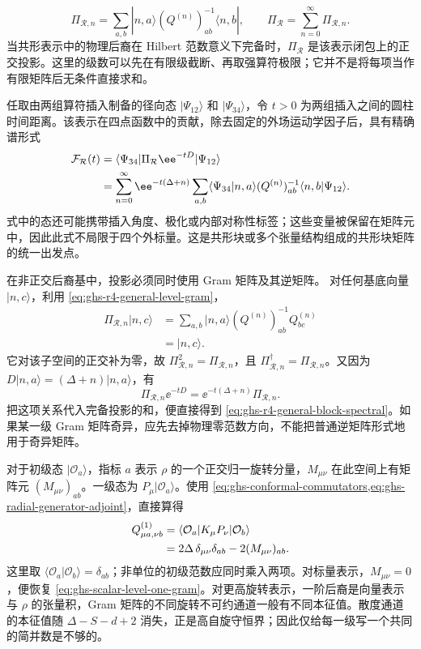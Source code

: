 \begin{equation}\label{eq:ghs-r4-general-projector}
 \Pi_{\mathcal R,n}=\sum_{a,b}|n,a\rangle
 (Q^{(n)})^{-1}_{ab}\langle n,b|,
 \qquad
 \Pi_{\mathcal R}=\sum_{n=0}^\infty\Pi_{\mathcal R,n}.
\end{equation}
当共形表示中的物理后裔在 Hilbert 范数意义下完备时，$\Pi_{\mathcal R}$ 是该表示闭包上的正交投影。这里的级数可以先在有限级截断、再取强算符极限；它并不是将每项当作有限矩阵后无条件直接求和。

任取由两组算符插入制备的径向态 $|\Psi_{12}\rangle$ 和 $|\Psi_{34}\rangle$，令 $t>0$ 为两组插入之间的圆柱时间距离。该表示在四点函数中的贡献，除去固定的外场运动学因子后，具有精确谱形式
\begin{align}\label{eq:ghs-r4-general-block-spectral}
 \mathcal F_{\mathcal R}(t)
 &=\langle\Psi_{34}|\Pi_{\mathcal R}\ee^{-tD}|\Psi_{12}\rangle\\
 &=\sum_{n=0}^\infty\ee^{-t(\Delta+n)}
 \sum_{a,b}\langle\Psi_{34}|n,a\rangle
 (Q^{(n)})^{-1}_{ab}\langle n,b|\Psi_{12}\rangle.
 \notag
\end{align}
式中的态还可能携带插入角度、极化或内部对称性标签；这些变量被保留在矩阵元中，因此此式不局限于四个外标量。这是共形块或多个张量结构组成的共形块矩阵的统一出发点。


在非正交后裔基中，投影必须同时使用 Gram 矩阵及其逆矩阵。
对任何基底向量 $|n,c\rangle$，利用 \cref{eq:ghs-r4-general-level-gram}，
\begin{align*}
 \Pi_{\mathcal R,n}|n,c\rangle
 &=\sum_{a,b}|n,a\rangle(Q^{(n)})^{-1}_{ab}Q^{(n)}_{bc}\\
 &=|n,c\rangle.
\end{align*}
它对该子空间的正交补为零，故 $\Pi_{\mathcal R,n}^2=\Pi_{\mathcal R,n}$，且 $\Pi_{\mathcal R,n}^\dagger=\Pi_{\mathcal R,n}$。又因为 $D|n,a\rangle=(\Delta+n)|n,a\rangle$，有
\begin{equation*}
 \Pi_{\mathcal R,n}\ee^{-tD}=\ee^{-t(\Delta+n)}\Pi_{\mathcal R,n}.
\end{equation*}
把这项关系代入完备投影的和，便直接得到 \cref{eq:ghs-r4-general-block-spectral}。如果某一级 Gram 矩阵奇异，应先去掉物理零范数方向，不能把普通逆矩阵形式地用于奇异矩阵。


对于初级态 $|\mathcal O_a\rangle$，指标 $a$ 表示 $\rho$ 的一个正交归一旋转分量，$M_{\mu\nu}$ 在此空间上有矩阵元 $(M_{\mu\nu})_{ab}$。一级态为 $P_\mu|\mathcal O_a\rangle$。使用 \cref{eq:ghs-conformal-commutators,eq:ghs-radial-generator-adjoint}，直接算得
\begin{align}\label{eq:ghs-r4-spinning-first-gram}
 Q^{(1)}_{\mu a,\nu b}
 &=\langle\mathcal O_a|K_\mu P_\nu|\mathcal O_b\rangle\\
 &=2\Delta\,\delta_{\mu\nu}\delta_{ab}
 -2(M_{\mu\nu})_{ab}.
 \notag
\end{align}
这里取 $\langle\mathcal O_a|\mathcal O_b\rangle=\delta_{ab}$；非单位的初级范数应同时乘入两项。对标量表示，$M_{\mu\nu}=0$，便恢复 \cref{eq:ghs-scalar-level-one-gram}。对更高旋转表示，一阶后裔是向量表示与 $\rho$ 的张量积，Gram 矩阵的不同旋转不可约通道一般有不同本征值。散度通道的本征值随 $\Delta-S-d+2$ 消失，正是高自旋守恒界；因此仅给每一级写一个共同的简并数是不够的。

